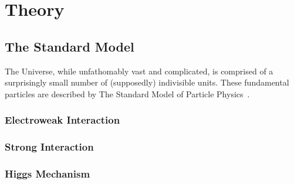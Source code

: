 \chapter{Theory}\label{ch:theory}

\section{The Standard Model}\label{sec:sm}

The Universe, while unfathomably vast and complicated, is comprised of a surprisingly small number of (supposedly) indivisible units.
These fundamental particles are described by The Standard Model of Particle Physics~\cite{someguy}.

\subsection{Electroweak Interaction}\label{subsec:ew_inter}

\subsection{Strong Interaction}\label{subsec:strong_inter}

\subsection{Higgs Mechanism}\label{subsec:higgs_mech}